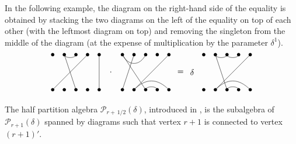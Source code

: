 \documentclass[ALCO,ThmDefs,Unicode,epreuves]{cedram}
\newcommand{\Ptn}{\mathcal{P}}
\newcommand{\half}{\, 1/2} %
\begin{document}
	
	
\begin{exam}
In the following example, the diagram on the right-hand side of the
equality is obtained by stacking the two diagrams on the left of the
equality on top of each other (with the leftmost diagram on top) and
removing the singleton from the middle of the diagram (at the expense
of multiplication by the parameter $\delta^1$).
\[
\begin{tikzpicture}[scale=0.5]
\foreach \x in {1,...,5,7,8,...,11,14,15,...,18}
	 {\fill[black] (\x,0) circle (4pt);
	 \fill[black] (\x,3) circle (4pt);}
	 \draw (3,3) arc (0:-180:0.5 and 0.25) -- (3,0);
 \draw (4,3)--(1,0);\draw (5,3)--(5,0);
	\draw (6,1.5) node {$\cdot$};
	\draw (9,3) .. controls (8.5,2) and (7.5,2) .. (7,3) -- (9,0)
 arc (180:0:0.5 and 0.25);
	\draw (8,3)--(7,0);
	\draw (11,0) .. controls (10,1) and (9,1) .. (8,0) -- (11,3);
	\draw (12,1.5) node {$=$};\draw (13,1.5) node {$\delta$};
	\draw (18,0) .. controls (17,1) and (16,1) .. (15,0) -- (18,3);
	\draw (17,3) arc (0:-180:0.5 and 0.25)
 arc (0:-180:0.5 and 0.25) -- (16,0) arc (180:0:0.5 and 0.25);
\end{tikzpicture}
\]
\end{exam}
	
The half partition algebra $\Ptn_{r+\half}(\delta)$, introduced in
\cite{Martin:2000}, is the subalgebra of $\Ptn_{r+1}(\delta)$ spanned
by diagrams such that vertex $r+1$ is connected to vertex $(r+1)'$.
\end{document}
